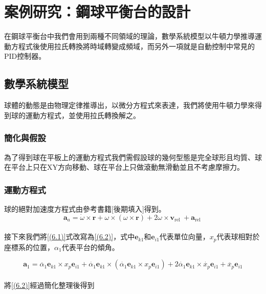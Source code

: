 \chapter{案例研究：鋼球平衡台的設計}
在鋼球平衡台中我們會用到兩種不同領域的理論，數學系統模型以牛頓力學推導運動方程式後使用拉氏轉換將時域轉變成頻域，而另外一項就是自動控制中常見的PID控制器。\\

\section{數學系統模型}
球體的動態是由物理定律推導出，以微分方程式來表達，我們將使用牛頓力學來得到球的運動方程式，並使用拉氏轉換解之。\\

\subsection{簡化與假設}
為了得到球在平板上的運動方程式我們需假設球的幾何型態是完全球形且均質、球在平台上只在XY方向移動、球在平台上只做滾動無滑動並且不考慮摩擦力。\\

\subsection{運動方程式}
球的絕對加速度方程式由參考書籍[後期填入]得到。\\

\begin{equation}
\mathbf{a}_a=\dot{\omega} \times \mathbf{r}+\omega \times(\omega \times \mathbf{r})+2 \omega \times \mathbf{v}_{\text {rel }}+\mathbf{a}_{\text {rel }}
\label{((6.1))}
\end{equation} \\

接下來我們將\ref{(6.1)}式改寫為\ref{(6.2)}，式中\(\mathbf{e}_{k1}\)和\(\mathbf{e}_{i1}\)代表單位向量，\(x_p\)代表球相對於座標系的位置，\(\alpha_1\)代表平台的傾角。

\begin{equation}
\mathbf{a}_1=\ddot{\alpha_1} \mathbf{e}_{k1} \times x_p \mathbf{e}_{i1}+\dot{\alpha_1} \mathbf{e}_{k1} \times\left(\dot{\alpha_1} \mathbf{e}_{k1} \times x_p \mathbf{e}_{i1}\right)+2 \dot{\alpha_1} \mathbf{e}_{k1} \times \dot{x_p} \mathbf{e}_{i1}+\ddot{x_p} \mathbf{e}_{i1}
\label{(6.2)}
\end{equation} \\

將\ref{(6.2)}經過簡化整理後得到

